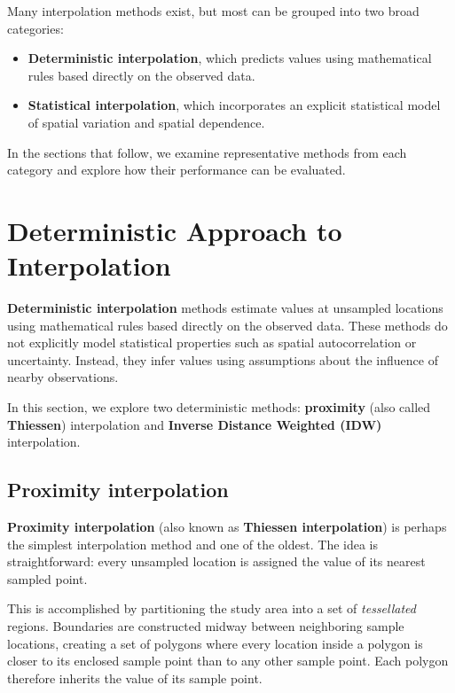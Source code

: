 \documentclass[
  letterpaper,
]{book}
\providecommand{\tightlist}{%
  \setlength{\itemsep}{0pt}\setlength{\parskip}{0pt}}
\begin{document}
Many interpolation methods exist, but most can be grouped into two broad
categories:

\begin{itemize}
\tightlist
\item
  \textbf{Deterministic interpolation}, which predicts values using
  mathematical rules based directly on the observed data.
\item
  \textbf{Statistical interpolation}, which incorporates an explicit
  statistical model of spatial variation and spatial dependence.
\end{itemize}

In the sections that follow, we examine representative methods from each
category and explore how their performance can be evaluated.

\section{Deterministic Approach to
Interpolation}\label{deterministic-approach-to-interpolation}

\textbf{Deterministic interpolation} methods estimate values at
unsampled locations using mathematical rules based directly on the
observed data. These methods do not explicitly model statistical
properties such as spatial autocorrelation or uncertainty. Instead, they
infer values using assumptions about the influence of nearby
observations.

In this section, we explore two deterministic methods:
\textbf{proximity} (also called \textbf{Thiessen}) interpolation and
\textbf{Inverse Distance Weighted (IDW)} interpolation.

\subsection{Proximity interpolation}\label{proximity-interpolation}

\textbf{Proximity interpolation} (also known as \textbf{Thiessen
interpolation}) is perhaps the simplest interpolation method and one of
the oldest. The idea is straightforward: every unsampled location is
assigned the value of its nearest sampled point.

This is accomplished by partitioning the study area into a set of
\emph{tessellated} regions. Boundaries are constructed midway between
neighboring sample locations, creating a set of polygons where every
location inside a polygon is closer to its enclosed sample point than to
any other sample point. Each polygon therefore inherits the value of its
sample point.
\end{document}
